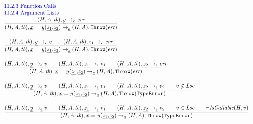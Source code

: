 \documentclass[a4paper, leqno]{amsart}
\newcommand{\rulesep}{\quad\quad}
\newcommand{\stmt}{s}
\newcommand{\expr}{e}
\newcommand{\ir}[1]{\ensuremath{\underline{#1}}}
\newcommand{\irid}{\ir{x}}
\def\inblue{\color{blue}}
\newcommand{\tb}{\emph{tb}}
\newcommand{\err}{\emph{err}}
\newcommand{\te}{{\tt TypeError}}
\newcommand{\Loc}{\emph{Loc}}
\newcommand{\hf}[1]{\emph{#1}}
\newcommand{\error}{\ensuremath{{\tt Throw}(\err)}}
\newcommand{\thte}{\ensuremath{{\tt Throw}(\te)}}
\newcommand{\state}{\ensuremath{(H,A,\tb)}}
\newcommand{\res}{\ensuremath{(H,A)}}
\newcommand{\evale}{\ensuremath{(H,A,\tb)}}
\newcommand{\ircall}{\ensuremath{\irid \ {\tt =} \ \ir{y}{\tt(}\ir{z_1}{\tt,}\ir{z_2}{\tt)}}}
\def\inblue{\color{blue}}
\begin{document}
\[
\begin{array}{l@{~~}l@{~~}ll}
\mbox{\inblue 11.2.3 Function Calls}\\
\mbox{\inblue 11.2.4 Argument Lists}\\

\frac{\begin{matrix}
\evale, \ir{y} \rightarrow_{\ir\expr} \err
\end{matrix}}{\begin{matrix}
\state, \ircall \rightarrow_{\ir\stmt}
\res, \error
\end{matrix}}
\\[2em]

\frac{\begin{matrix}
\evale, \ir{y} \rightarrow_{\ir\expr} v
\rulesep
\evale, \ir{z_1} \rightarrow_{\ir\expr} \err
\end{matrix}}{\begin{matrix}
\state, \ircall \rightarrow_{\ir\stmt}
\res, \error
\end{matrix}}
\\[2em]

\frac{\begin{matrix}
\evale, \ir{y} \rightarrow_{\ir\expr} v
\rulesep
\evale, \ir{z_1} \rightarrow_{\ir\expr} v_1
\rulesep
\evale, \ir{z_2} \rightarrow_{\ir\expr} \err
\end{matrix}}{\begin{matrix}
\state, \ircall \rightarrow_{\ir\stmt}
\res, \error
\end{matrix}}
\\[2em]

\frac{\begin{matrix}
\evale, \ir{y} \rightarrow_{\ir\expr} v
\rulesep
\evale, \ir{z_1} \rightarrow_{\ir\expr} v_1
\rulesep
\evale, \ir{z_2} \rightarrow_{\ir\expr} v_2
\rulesep
v \not\in \Loc
\end{matrix}}{\begin{matrix}
\state, \ircall \rightarrow_{\ir\stmt}
\res, \thte
\end{matrix}}
\\[2em]

\frac{\begin{matrix}
\evale, \ir{y} \rightarrow_{\ir\expr} v
\rulesep
\evale, \ir{z_1} \rightarrow_{\ir\expr} v_1
\rulesep
\evale, \ir{z_2} \rightarrow_{\ir\expr} v_2
\rulesep
v \in \Loc
\rulesep
\neg\hf{IsCallable}(H,v)
\end{matrix}}{\begin{matrix}
\state, \ircall \rightarrow_{\ir\stmt}
\res, \thte
\end{matrix}}
\\[2em]


\end{array}\]
\end{document}
